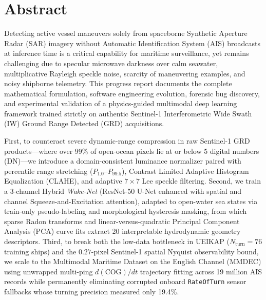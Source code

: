 \documentclass[11pt,a4paper]{article}
\begin{document}
\section{Abstract}

Detecting active vessel maneuvers solely from spaceborne Synthetic Aperture Radar (SAR) imagery without Automatic Identification System (AIS) broadcasts at inference time is a critical capability for maritime surveillance, yet remains challenging due to specular microwave darkness over calm seawater, multiplicative Rayleigh speckle noise, scarcity of maneuvering examples, and noisy shipborne telemetry. This progress report documents the complete mathematical formulation, software engineering evolution, forensic bug discovery, and experimental validation of a physics-guided multimodal deep learning framework trained strictly on authentic Sentinel-1 Interferometric Wide Swath (IW) Ground Range Detected (GRD) acquisitions.

First, to counteract severe dynamic-range compression in raw Sentinel-1 GRD products---where over 99\% of open-ocean pixels lie at or below 5 digital numbers (DN)---we introduce a domain-consistent luminance normalizer paired with percentile range stretching ($P_{1.0}$--$P_{99.5}$), Contrast Limited Adaptive Histogram Equalization (CLAHE), and adaptive $7\times 7$ Lee speckle filtering. Second, we train a 3-channel Hybrid \textit{Wake-Net} (ResNet-50 U-Net enhanced with spatial and channel Squeeze-and-Excitation attention), adapted to open-water sea states via train-only pseudo-labeling and morphological hysteresis masking, from which sparse Radon transforms and linear-versus-quadratic Principal Component Analysis (PCA) curve fits extract 20 interpretable hydrodynamic geometry descriptors. Third, to break both the low-data bottleneck in UEIKAP ($N_{\text{turn}}=76$ training ships) and the $0.27$-pixel Sentinel-1 spatial Nyquist observability bound, we scale to the Multimodal Maritime Dataset on the English Channel (MMDEC) using unwrapped multi-ping $d(\text{COG})/dt$ trajectory fitting across 19 million AIS records while permanently eliminating corrupted onboard \texttt{RateOfTurn} sensor fallbacks whose turning precision measured only 19.4\%.
\end{document}
